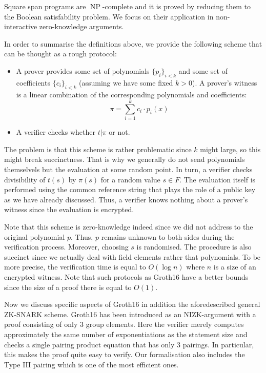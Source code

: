 \documentclass{article}
\theoremstyle{definition}
\theoremstyle{remark}
\begin{document}
Square span programs are $\operatorname{NP}$-complete and it is proved by reducing them to the Boolean satisfability problem.
We focus on their application in non-interactive zero-knowledge arguments.

In order to summarise the definitions above, we provide the following scheme that can be thought as a rough protocol:
\begin{itemize}
  \item A prover provides some set of polynomials $\{ p_i \}_{i < k}$ and some set of coefficients $\{c_i \}_{i < k}$ (assuming we have some fixed $k > 0$). A prover's witness is a linear combination of the corresponding polynomials and coefficients:
  \begin{equation}
  \pi = \sum \limits_{i = 1}^{k} c_i \cdot p_i(x)
  \end{equation}
  \item A verifier checks whether $t | \pi$ or not.
\end{itemize}

The problem is that this scheme is rather problematic since $k$ might large, so this might break succinctness.
That is why we generally do not send polynomials themselvels but the evaluation at some random point.
In turn, a verifier checks divisibility of $t(s)$ by $\pi(s)$ for a random value $s \in F$.
The evaluation itself is performed using the common reference string that plays the role of a
public key as we have already discussed. Thus, a verifier knows nothing about a prover's witness since the evaluation is encrypted.

Note that this scheme is zero-knowledge indeed since we did not address to the original polynomial $p$.
Thus, $p$ remains unknown to both sides during the verification process. Moreover, choosing $s$ is randomised.
The procedure is also succinct since we actually deal with field elements rather that polynomials. 
To be more precise, the verification time is equal to $O(\log n)$ where $n$ is a size of an encrypted witness. 
Note that such protocols as Groth16 have a better bounds since the size of a proof there is equal to $O(1)$.

Now we discuss specific aspects of Groth16 in addition the aforedescribed general ZK-SNARK scheme.
Groth16 has been introduced as an NIZK-argument with a proof consisting of only 3 group elements.
Here the verifier merely computes approximately the same number of exponentiations as the statement size
and checks a single pairing product equation that has only 3 pairings.
In particular, this makes the proof quite easy to verify.
Our formalisation also includes the Type III pairing which is one of the most efficient ones.
\end{document}
